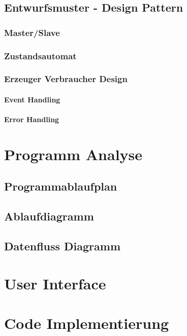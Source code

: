 	\subsection{Entwurfsmuster - Design Pattern}
		\subsubsection{Master/Slave}
		\subsubsection{Zustandsautomat}%
		\subsubsection{Erzeuger Verbraucher Design} %
		\paragraph{Event Handling}
		\paragraph{Error Handling} %
		
\section{Programm Analyse}
		\subsection{Programmablaufplan} %
		\subsection{Ablaufdiagramm }
		\subsection{Datenfluss Diagramm}
		
\section{User Interface}

\section{Code Implementierung}
